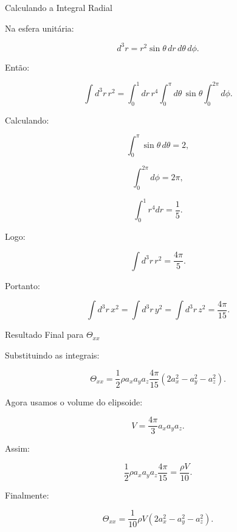 \documentclass[aspectratio=169]{beamer}
\begin{document}
\begin{frame}{Calculando a Integral Radial}

\small

Na esfera unitária:

\[
d^3r
=
r^2\sin\theta\,dr\,d\theta\,d\phi.
\]

Então:

\[
\int d^3r\,r^2
=
\int_0^1dr\,r^4
\int_0^\pi d\theta\,\sin\theta
\int_0^{2\pi}d\phi.
\]

Calculando:

\[
\int_0^\pi\sin\theta\,d\theta=2,
\]

\[
\int_0^{2\pi}d\phi=2\pi,
\]

\[
\int_0^1 r^4dr=\frac15.
\]

Logo:

\[
\int d^3r\,r^2
=
\frac{4\pi}{5}.
\]

Portanto:

\begin{eqbox}
\begin{equation}
\int d^3r\,x^2
=
\int d^3r\,y^2
=
\int d^3r\,z^2
=
\frac{4\pi}{15}.
\tag{4.76}
\end{equation}
\end{eqbox}

\end{frame}

\begin{frame}{Resultado Final para \(\Theta_{xx}\)}

\small

Substituindo as integrais:

\[
\Theta_{xx}
=
\frac12
\rho a_xa_ya_z
\frac{4\pi}{15}
\left(
2a_x^2-a_y^2-a_z^2
\right).
\]

Agora usamos o volume do elipsoide:

\begin{eqbox}
\begin{equation}
V
=
\frac{4\pi}{3}
a_xa_ya_z.
\tag{4.77}
\end{equation}
\end{eqbox}

Assim:

\[
\frac12
\rho a_xa_ya_z
\frac{4\pi}{15}
=
\frac{\rho V}{10}.
\]

Finalmente:

\begin{eqbox}
\begin{equation}
\Theta_{xx}
=
\frac1{10}
\rho V
\left(
2a_x^2-a_y^2-a_z^2
\right).
\tag{4.78}
\end{equation}
\end{eqbox}

\end{frame}
\end{document}
